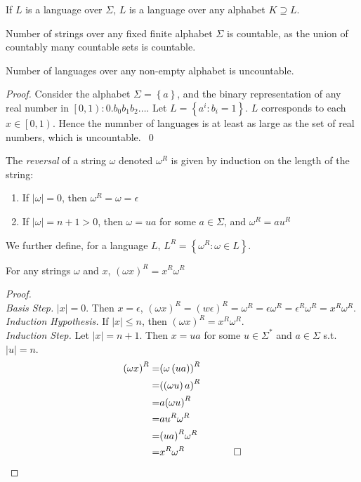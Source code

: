 \begin{corollary}
  If $L$ is a language over $\Sigma$, $L$ is a language over any alphabet $K\supseteq L$.
\end{corollary}
\begin{theorem}
  Number of strings over any fixed finite alphabet $\Sigma$ is countable, as
  the union of countably many countable sets is countable.
\end{theorem}
\begin{theorem}
  Number of languages over any non-empty alphabet is uncountable.
\end{theorem}
\begin{proof}
  Consider the alphabet $\Sigma=\left\{ a \right\}$, and the binary representation
  of any real number in $\left[\left.0,1\right)\right.:0.b_0b_1b_2\ldots$. Let
  $L=\left\{ a^{i}:b_i=1 \right\}$. $L$ corresponds to each $x\in
  \left[\left.0,1\right.\right)$. Hence the numnber of languages is at least as
  large as the set of real numbers, which is uncountable.\ \qed%
\end{proof}
\begin{definition}[Reverse]
  The \textit{reversal} of a string $\omega$ denoted $\omega^{R}$ is given by induction
  on the length of the string:
  \begin{enumerate}
    \item If $\left| \omega \right| =0$, then $\omega^{R}=\omega=\epsilon$
    \item If $\left| \omega \right| =n+1>0$, then $\omega=ua$ for some $a\in \Sigma$, and $\omega^{R}=au^{R}$
  \end{enumerate}
  We further define, for a language $L$, $L^{R}=\left\{ \omega^{R}:\omega\in L \right\}$.
\end{definition}
\begin{prop}
  For any strings $\omega$ and $x$, ${\left( \omega x \right)}^{R}=x^{R}\omega^{R}$
\end{prop}
\begin{proof}\\
  \textit{Basis Step.} $\left| x \right| =0$. Then $x=\epsilon$, ${\left(\omega
  x\right)}^{R}={\left( w\epsilon
  \right)}^{R}=\omega^{R}=\epsilon\omega^{R}=\epsilon^{R}\omega^{R}=x^{R}\omega^{R}$.\\
  \textit{Induction Hypothesis.} If $\left| x \right| \le n$, then ${\left(
  \omega x\right) }^{R}=x^{R}\omega^{R}$. \\
  \textit{Induction Step.} Let $\left| x \right| =n+1$. Then $x=ua$ for some $u\in \Sigma^{*}$ and $a\in \Sigma$ s.t. $\left| u \right| =n$. 
  \begin{align*}
    {\left( \omega x \right) }^{R}=&{\left( \omega\left( ua \right)  \right) }^{R}\\
    =&{\left( \left( \omega u \right) a \right) }^{R}\\
    =&a{\left( \omega u\right) }^{R}\\
    =&au^{R}\omega^{R}\\
    =&{\left( ua \right) }^{R}\omega^{R}\\
    =&x^{R}\omega^{R}\quad\qquad\qed
  \end{align*}
\end{proof}
